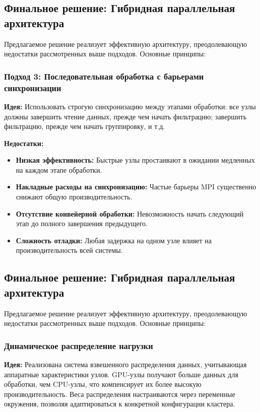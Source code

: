 \documentclass[areaset=advanced]{scrartcl}
\begin{document}
\subsection{Финальное решение: Гибридная параллельная архитектура}

Предлагаемое решение реализует эффективную архитектуру, преодолевающую недостатки рассмотренных выше подходов. Основные принципы:

\subsubsection{Подход 3: Последовательная обработка с барьерами синхронизации}

\textbf{Идея:} Использовать строгую синхронизацию между этапами обработки: все узлы должны завершить чтение данных, прежде чем начать фильтрацию; завершить фильтрацию, прежде чем начать группировку, и т.д.

\textbf{Недостатки:}
\begin{itemize}
    \item \textbf{Низкая эффективность:} Быстрые узлы простаивают в ожидании медленных на каждом этапе обработки.
    \item \textbf{Накладные расходы на синхронизацию:} Частые барьеры MPI существенно снижают общую производительность.
    \item \textbf{Отсутствие конвейерной обработки:} Невозможность начать следующий этап до полного завершения предыдущего.
    \item \textbf{Сложность отладки:} Любая задержка на одном узле влияет на производительность всей системы.
\end{itemize}

\subsection{Финальное решение: Гибридная параллельная архитектура}

Предлагаемое решение реализует эффективную архитектуру, преодолевающую недостатки рассмотренных выше подходов. Основные принципы:

\subsubsection{Динамическое распределение нагрузки}

\textbf{Идея:} Реализована система взвешенного распределения данных, учитывающая аппаратные характеристики узлов. GPU-узлы получают больше данных для обработки, чем CPU-узлы, что компенсирует их более высокую производительность. Веса распределения настраиваются через переменные окружения, позволяя адаптироваться к конкретной конфигурации кластера.
\end{document}
